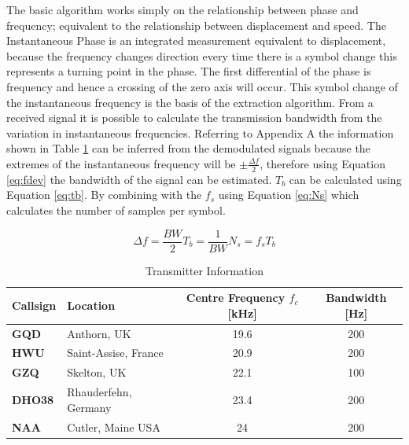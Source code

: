 The basic algorithm works simply on the relationship between phase and frequency; equivalent to the relationship between displacement and speed. The Instantaneous Phase is an integrated measurement equivalent to displacement, because the frequency changes direction every time there is a symbol change this represents a turning point in the phase. The first differential of the phase is frequency and hence a crossing of the zero axis will occur. This symbol change of the instantaneous frequency is the basis of the extraction algorithm. From a received signal it is possible to calculate the transmission bandwidth from the variation in instantaneous frequencies. Referring to Appendix A the information shown in Table \ref{tab:transinfo} can be inferred from the demodulated signals because the extremes of the instantaneous frequency will be $\pm \frac{\Delta f}{2}$, therefore using Equation \ref{eq:fdev} the bandwidth of the signal can be estimated. $T_b$ can be calculated using Equation \ref{eq:tb}. By combining with the $f_s$ using Equation \ref{eq:Ns} which calculates the number of samples per symbol. 

\begin{multicols}{3}
\begin{subequations}
\begin{equation}
    \Delta f = \frac{BW}{2}
    \label{eq:fdev}
\end{equation}
\begin{equation}
    T_b = \frac{1}{BW}
    \label{eq:tb}
\end{equation}
\begin{equation}
    N_s = f_sT_b
    \label{eq:Ns}
\end{equation}
\end{subequations}
\end{multicols}
\begin{table}[h!]
    \centering
    \begin{tabular}{l|l|c|c}
    \textbf{Callsign} & \textbf{Location} & \textbf{Centre Frequency
    $f_c$}[kHz] & \textbf{Bandwidth} [Hz] \\
    \hline
    \textbf{GQD} & Anthorn, UK & 19.6 & 200 \\
    \textbf{HWU} & Saint-Assise, France & 20.9 & 200 \\
    \textbf{GZQ} & Skelton, UK & 22.1 & 100 \\
    \textbf{DHO38} & Rhauderfehn, Germany & 23.4 & 200 \\
    \textbf{NAA} & Cutler, Maine USA & 24 & 200 \\
    \end{tabular}
    \caption{Transmitter Information}
    \label{tab:transinfo}
\end{table}

